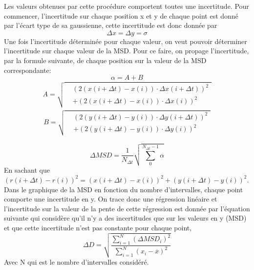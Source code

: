 \documentclass[conference]{IEEEtran}
\begin{document}
Les valeurs obtenues par cette procédure comportent toutes une incertitude. Pour commencer, l'incertitude sur chaque 
position x et y de chaque point est donné par l'écart type de sa gaussienne, cette incertitude est donc donnée par 
\begin{equation}
  \Delta x=\Delta y=\sigma 
\end{equation}
Une fois l'incertitude déterminée pour chaque valeur, on veut pouvoir déterminer l'incertitude sur chaque valeur de la MSD. 
Pour ce faire, on propage l'incertitude, par la formule suivante, de chaque position sur la valeur de la MSD  correspondante: 
\begin{equation}
  \alpha =A+B
\end{equation}
\begin{align*}
  A = \sqrt{
    \begin{aligned}
      &\left( 2(x(i+\Delta t) - x(i))\cdot \Delta x(i+\Delta t) \right)^2 \\
      &+ \left( 2(x(i+\Delta t) - x(i))\cdot \Delta x(i) \right)^2
    \end{aligned}
  }
\end{align*}
\begin{align*}
  B = \sqrt{
    \begin{aligned}
      &\left( 2(y(i+\Delta t) - y(i))\cdot \Delta y(i+\Delta t) \right)^2 \\
      &+ \left( 2(y(i+\Delta t) - y(i))\cdot \Delta y(i) \right)^2
    \end{aligned}
  }
\end{align*}

\begin{equation}
  \Delta MSD=\frac{1}{N_{\Delta t}}\sqrt{\sum_{0}^{N_{\Delta t}-1}\alpha }
\end{equation}
En sachant que $\left ( r(i+\Delta t)-r(i) \right )^{2}=\left ( x(i+\Delta t)-x(i) \right )^{2}+\left ( y(i+\Delta t)-y(i) \right )^{2}$.
Dans le graphique de la MSD en fonction du nombre d'intervalles, chaque point comporte une incertitude en y. On 
trace donc une régression linéaire et l'incertitude sur la valeur de la pente de cette régression est donnée par l'équation suivante
qui considère qu'il n'y a des incertitudes que sur les valeurs en y (MSD) et que cette incertitude n'est pas constante pour chaque point, 
\begin{equation}
  \Delta D=\sqrt{\frac{\sum_{i=1}^{N}(\Delta MSD_{i})^{2}}{\sum_{i=1}^{N}{(x_{i}-\overline{x})^{2}}}}
\end{equation}
Avec N qui est le nombre d'intervalles considéré. 
\end{document}
